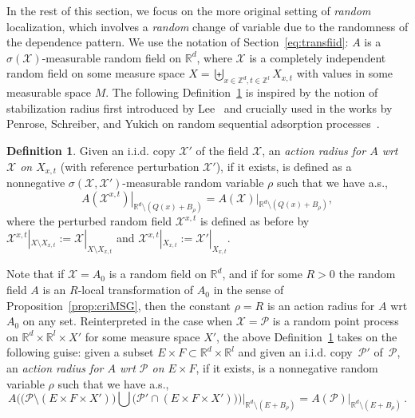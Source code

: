 \documentclass[10pt]{amsart}
\theoremstyle{definition}\newtheorem{defi}[theo]{Definition}\newtheorem{rema}[theo]{Remark}\newtheorem{exam}[theo]{Example}\newtheorem{exem}[theo]{Example}\newtheorem{nota}[theo]{Notation}
\newcommand{\R}{\mathbb R}
\newcommand{\Z}{\mathbb Z}
\newcommand{\X}{\mathcal X}
\newcommand{\Pc}{\mathcal P}
\begin{document}
In the rest of this section, we focus on the more original setting of \emph{random} localization, which involves a \emph{random} change of variable due to the randomness of the dependence pattern. We use the notation of Section~\ref{eq:transfiid}: $A$ is a $\sigma(\X)$-measurable random field on $\R^d$, where $\X$ is a completely independent random field on some measure space $X=\biguplus_{x\in\Z^d,t\in\Z^l}X_{x,t}$ with values in some measurable space $M$. The following Definition~\ref{def:ar} is inspired by the notion of stabilization radius first introduced by Lee~\cite{Lee-97,Lee-99} and crucially used in the works by Penrose, Schreiber, and Yukich on random sequential adsorption processes~\cite{Penrose-05,Penrose-Yukich-02,PY-05,Schreiber-Penrose-Yukich-07}.
\begin{defi}\label{def:ar}
Given an i.i.d. copy $\X'$ of the field $\X$, an \emph{ action radius for $A$ wrt $\X$ on $X_{x,t}$} (with reference perturbation $\X'$), if it exists, is defined as a nonnegative $\sigma(\X,\X')$-measurable random variable $\rho$ such that we have a.s.,
\[
\left.A(\X^{x,t})\right|_{\R^d\setminus (Q(x)+B_\rho)}=\left.A(\X)\right|_{\R^d\setminus(Q(x)+B_\rho)},
\]
where the perturbed random field $\X^{x,t}$ is defined as before by $\X^{x,t}|_{X\setminus X_{x,t}}:=\X|_{X\setminus X_{x,t}}$ and $\X^{x,t}|_{X_{x,t}}:=\X'|_{X_{x,t}}$.
\end{defi}
Note that if $\X=A_0$ is a random field on $\R^d$, and if for some $R>0$ the random field $A$ is an $R$-local transformation of $A_0$ in the sense of Proposition~\ref{prop:criMSG}, then the constant $\rho=R$ is an action radius for $A$ wrt $A_0$ on any set. Reinterpreted in the case when $\X=\Pc$ is a random point process on $\R^d\times\R^{l}\times X'$ for some measure space $X'$, the above Definition~\ref{def:ar} takes on the following guise: given a subset $E\times F\subset \R^d\times \R^{l}$ and given an i.i.d. copy~$\Pc'$ of~$\Pc$, an \emph{action radius for $A$ wrt $\Pc$ on $E\times F$}, if it exists, is a nonnegative random variable $\rho$ such that we have a.s.,
\[
A\Big(\big(\Pc\setminus (E\times F\times X')\big)\bigcup \big(\Pc'\cap (E\times F\times X')\big)\Big)\Big|_{\R^d\setminus (E+B_\rho)}=A(\Pc)\big|_{\R^d\setminus (E+B_\rho)}\,.
\]
\end{document}
